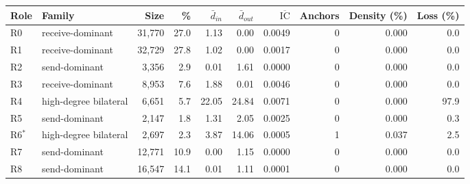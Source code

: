 \begin{tabular}{llrrrrrrrr}
\toprule
\textbf{Role} & \textbf{Family} & \textbf{Size} & \textbf{\%} & $\bar{d}_{in}$ & $\bar{d}_{out}$ & $\overline{\mathrm{IC}}$ & \textbf{Anchors} & \textbf{Density (\%)} & \textbf{Loss (\%)} \\
\midrule
R0 & receive-dominant & 31,770 & 27.0 & 1.13 & 0.00 & 0.0049 & 0 & 0.000 & 0.0 \\
R1 & receive-dominant & 32,729 & 27.8 & 1.02 & 0.00 & 0.0017 & 0 & 0.000 & 0.0 \\
R2 & send-dominant & 3,356 & 2.9 & 0.01 & 1.61 & 0.0000 & 0 & 0.000 & 0.0 \\
R3 & receive-dominant & 8,953 & 7.6 & 1.88 & 0.01 & 0.0046 & 0 & 0.000 & 0.0 \\
R4 & high-degree bilateral & 6,651 & 5.7 & 22.05 & 24.84 & 0.0071 & 0 & 0.000 & 97.9 \\
R5 & send-dominant & 2,147 & 1.8 & 1.31 & 2.05 & 0.0025 & 0 & 0.000 & 0.3 \\
R6$^*$ & high-degree bilateral & 2,697 & 2.3 & 3.87 & 14.06 & 0.0005 & 1 & 0.037 & 2.5 \\
R7 & send-dominant & 12,771 & 10.9 & 0.00 & 1.15 & 0.0000 & 0 & 0.000 & 0.0 \\
R8 & send-dominant & 16,547 & 14.1 & 0.01 & 1.11 & 0.0001 & 0 & 0.000 & 0.0 \\
\bottomrule
\end{tabular}
